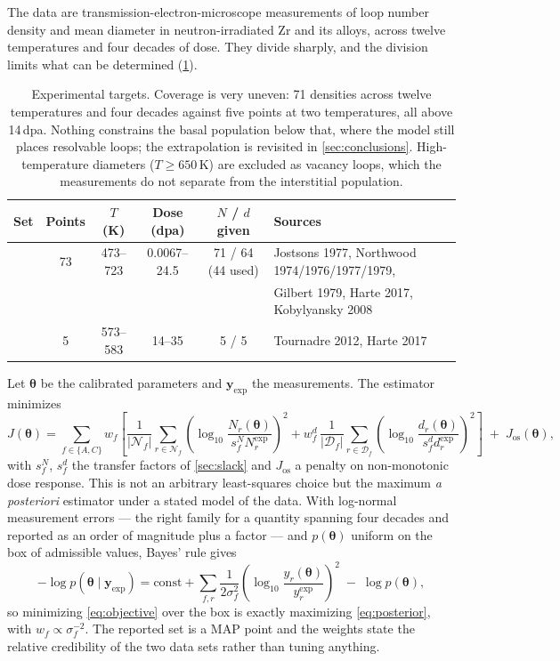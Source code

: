 The data are transmission-electron-microscope measurements of loop number
density and mean diameter in neutron-irradiated Zr and its alloys, across twelve
temperatures and four decades of dose. They divide sharply, and the division
limits what can be determined (\cref{tab:targets}).

\begin{table}[htbp]
\caption{Experimental targets. Coverage is very uneven: 71 \aloop{} densities
across twelve temperatures and four decades against five \cloop{} points at two
temperatures, all above 14\,dpa. Nothing constrains the basal population below
that, where the model still places resolvable loops; the extrapolation is
revisited in \cref{sec:conclusions}. High-temperature \aloop{} diameters
($T\ge650\,$K) are excluded as vacancy loops, which the measurements do not
separate from the interstitial population.}
\label{tab:targets}
\centering\small
\begin{tabular}{@{}lccccl@{}}
\toprule
Set & Points & $T$ (K) & Dose (dpa) & $N$ / $d$ given & Sources \\
\midrule
\aloop{} & 73 & 473--723 & 0.0067--24.5 & 71 / 64 (44 used) &
  Jostsons 1977, Northwood 1974/1976/1977/1979, \\
 & & & & & Gilbert 1979, Harte 2017, Kobylyansky 2008 \\
\cloop{} & 5 & 573--583 & 14--35 & 5 / 5 &
  Tournadre 2012, Harte 2017 \\
\bottomrule
\end{tabular}
\end{table}

Let $\bm\theta$ be the calibrated parameters and $\mathbf y_{\exp}$ the
measurements. The estimator minimizes
\begin{equation}
  J(\bm\theta)
  = \sum_{f\in\{A,C\}} w_f
    \left[
      \frac{1}{|\mathcal N_f|}\!\!\sum_{r\in\mathcal N_f}\!\!
        \left(\log_{10}\frac{N_r(\bm\theta)}{s^{N}_fN_r^{\exp}}\right)^{2}
      +w^{d}_f\,\frac{1}{|\mathcal D_f|}\!\!\sum_{r\in\mathcal D_f}\!\!
        \left(\log_{10}\frac{d_r(\bm\theta)}{s^{d}_fd_r^{\exp}}\right)^{2}
    \right]
    \;+\;J_{\mathrm{os}}(\bm\theta),
  \label{eq:objective}
\end{equation}
with $s^{N}_f$, $s^{d}_f$ the transfer factors of \cref{sec:slack} and
$J_{\mathrm{os}}$ a penalty on non-monotonic dose response. This is not an
arbitrary least-squares choice but the maximum \emph{a posteriori} estimator
under a stated model of the data. With log-normal measurement errors --- the
right family for a quantity spanning four decades and reported as an order of
magnitude plus a factor --- and $p(\bm\theta)$ uniform on the box of admissible
values, Bayes' rule gives
\begin{equation}
  -\log p(\bm\theta\mid\mathbf y_{\exp})
  = \mathrm{const} + \sum_{f,r}\frac{1}{2\sigma^{2}_{f}}
      \left(\log_{10}\frac{y_r(\bm\theta)}{y_r^{\exp}}\right)^{2}
    \;-\;\log p(\bm\theta),
  \label{eq:posterior}
\end{equation}
so minimizing \cref{eq:objective} over the box is exactly maximizing
\cref{eq:posterior}, with $w_f\propto\sigma_f^{-2}$. The reported set is a MAP
point and the weights state the relative credibility of the two data sets rather
than tuning anything.

